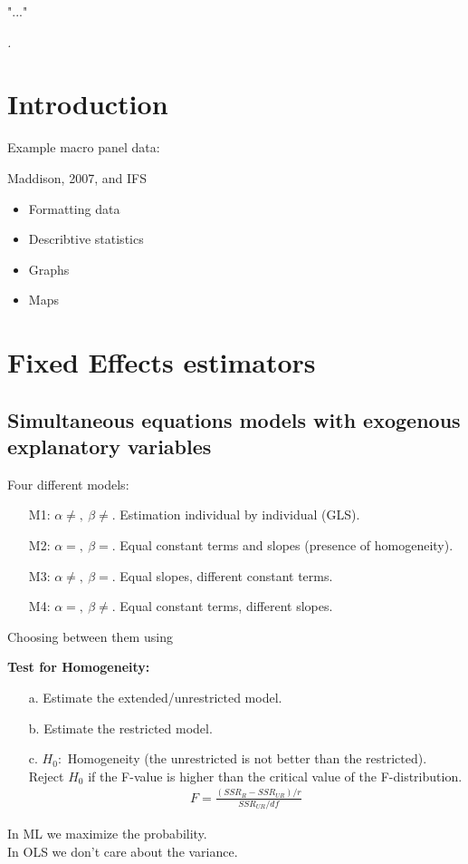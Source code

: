 \epigraph{"..."}
{\textit{.}}

\begin{multicols}{2}
 \section{Introduction}
 Example macro panel data:\par
 Maddison, 2007, and IFS
 \begin{itemize}
  \item Formatting data
  \item Describtive statistics
  \item Graphs
  \item Maps
 \end{itemize}
 \section{Fixed Effects estimators} %
 \subsection{Simultaneous equations models with exogenous explanatory variables}
 Four different models:
 \begin{itemize}
  \item[M1:] $\alpha\neq,\ \beta\neq.$ Estimation individual by individual (GLS).
  \item[M2:] $\alpha=,\ \beta=.$ Equal constant terms and slopes (presence of homogeneity).
  \item[M3:] $\alpha\neq,\ \beta=.$ Equal slopes, different constant terms.
  \item[M4:] $\alpha=,\ \beta\neq.$ Equal constant terms, different slopes.
 \end{itemize}
 Choosing between them using\par
 \textbf{Test for Homogeneity:}
 \begin{itemize}
  \item[a.] Estimate the extended/unrestricted model.
  \item[b.] Estimate the restricted model.
  \item[c.] $H_0:$ Homogeneity (the unrestricted is not better than the restricted).\\
        Reject $H_0$ if the F-value is higher than the critical value of the F-distribution.
        \begin{align*}
         F = \frac{(SSR_R-SSR_{UR})/r}{SSR_{UR}/df}
        \end{align*}
 \end{itemize}
 In ML we maximize the probability.\\
 In OLS we don't care about the variance.


\end{multicols}
